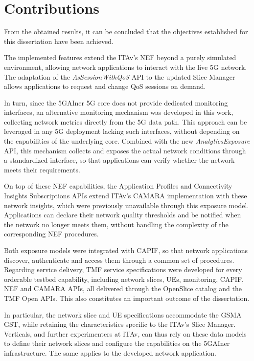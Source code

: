 \section{Contributions}
\label{chap:conclusions:contributions}

From the obtained results, it can be concluded that the objectives established for this dissertation have been achieved.

The implemented features extend the \acs{ITAv}'s \acs{NEF} beyond a purely simulated environment, allowing network applications to interact with the live \acs{5G} network. The adaptation of the \textit{AsSessionWithQoS} \acs{API} to the updated Slice Manager allows applications to request and change \acs{QoS} sessions on demand.

In turn, since the 5GAIner \acs{5G} core does not provide dedicated monitoring interfaces, an alternative monitoring mechanism was developed in this work, collecting network metrics directly from the \acs{5G} data path. This approach can be leveraged in any \acs{5G} deployment lacking such interfaces, without depending on the capabilities of the underlying core. Combined with the new \textit{AnalyticsExposure} \acs{API}, this mechanism collects and exposes the actual network conditions through a standardized interface, so that applications can verify whether the network meets their requirements.

On top of these \acs{NEF} capabilities, the Application Profiles and Connectivity Insights Subscriptions \acsp{API} extend \acs{ITAv}'s CAMARA implementation with these network insights, which were previously unavailable through this exposure model. Applications can declare their network quality thresholds and be notified when the network no longer meets them, without handling the complexity of the corresponding \acs{NEF} procedures.

Both exposure models were integrated with \acs{CAPIF}, so that network applications discover, authenticate and access them through a common set of procedures. Regarding service delivery, \acs{TMF} service specifications were developed for every orderable testbed capability, including network slices, \acsp{UE}, monitoring, \acs{CAPIF}, \acs{NEF} and CAMARA \acsp{API}, all delivered through the OpenSlice catalog and the \acs{TMF} Open \acsp{API}. This also constitutes an important outcome of the dissertation.

In particular, the network slice and \acs{UE} specifications accommodate the \acs{GSMA} \acs{GST}, while retaining the characteristics specific to the \acs{ITAv}'s Slice Manager. Verticals, and further experimenters at \acs{ITAv}, can thus rely on these data models to define their network slices and configure the capabilities on the 5GAIner infrastructure. The same applies to the developed network application.

